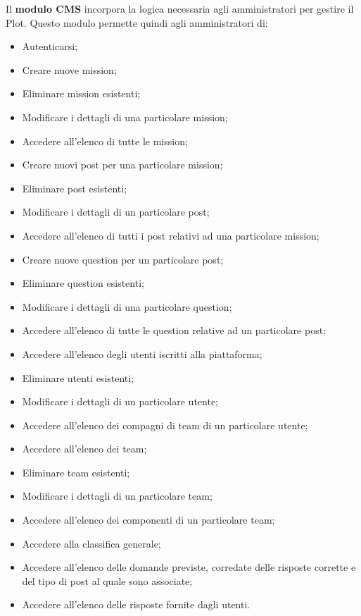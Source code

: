 Il \textbf{modulo CMS} incorpora la logica necessaria agli amministratori per gestire il Plot. Questo modulo permette quindi agli amministratori di:
\begin{itemize}
	\item Autenticarsi;
	\item Creare nuove mission;
	\item Eliminare mission esistenti;
	\item Modificare i dettagli di una particolare mission;
	\item Accedere all'elenco di tutte le mission;
	\item Creare nuovi post per una particolare mission;
	\item Eliminare post esistenti;
	\item Modificare i dettagli di un particolare post;
	\item Accedere all'elenco di tutti i post relativi ad una particolare mission;
	\item Creare nuove question per un particolare post;
	\item Eliminare question esistenti;
	\item Modificare i dettagli di una particolare question;
	\item Accedere all'elenco di tutte le question relative ad un particolare post;
	\item Accedere all'elenco degli utenti iscritti alla piattaforma;
	\item Eliminare utenti esistenti;
	\item Modificare i dettagli di un particolare utente;
	\item Accedere all'elenco dei compagni di team di un particolare utente;
	\item Accedere all'elenco dei team;
	\item Eliminare team esistenti;
	\item Modificare i dettagli di un particolare team;
	\item Accedere all'elenco dei componenti di un particolare team;
	\item Accedere alla classifica generale;
	\item Accedere all'elenco delle domande previste, corredate delle risposte corrette  e del tipo di post al quale sono associate;
	\item Accedere all'elenco delle risposte fornite dagli utenti.
\end{itemize}


